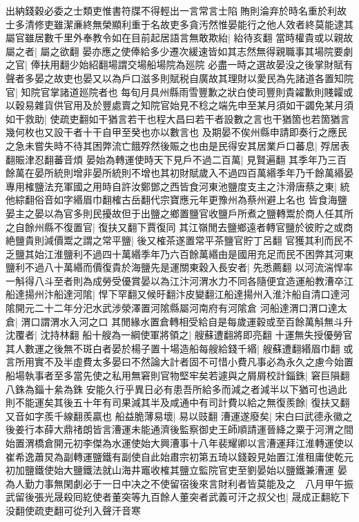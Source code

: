 出納錢穀必委之士類吏惟書符牒不得輕出一言常言士陷賄則淪弃於時名重於利故士多清修吏雖潔亷終無榮顯利重于名故吏多貪汚然惟晏能行之他人效者終莫能逮其屬官雖居數千里外奉教令如在目前起居語言無敢欺紿|{
	紿待亥翻}
當時權貴或以親故屬之者|{
	屬之欲翻}
晏亦應之使俸給多少遷次緩速皆如其志然無得親職事其場院要劇之官|{
	俸扶用翻少始紹翻場謂交場船場院為廵院}
必盡一時之選故晏没之後掌財賦有聲者多晏之故吏也晏又以為戶口滋多則賦税自廣故其理財以愛民為先諸道各置知院官|{
	知院官掌諸道廵院者也}
每旬月具州縣雨雪豐歉之狀白使司豐則貴糴歉則賤糶或以穀易雜貨供官用及於豐處賣之知院官始見不稔之端先申至某月須如干蠲免某月須如干救助|{
	使疏吏翻如干猶言若干也程大昌曰若干者設數之言也干猶箇也若箇猶言幾何枚也又設干者十干自甲至癸也亦以數言也}
及期晏不俟州縣申請即奏行之應民之急未嘗失時不待其困弊流亡餓殍然後賑之也由是民得安其居業戶口蕃息|{
	殍居表翻賑津忍翻蕃音煩}
晏始為轉運使時天下見戶不過二百萬|{
	見賢遍翻}
其季年乃三百餘萬在晏所統則增非晏所統則不增也其初財賦歲入不過四百萬緡季年乃千餘萬緡晏專用榷鹽法充軍國之用時自許汝鄭鄧之西皆食河東池鹽度支主之汴滑唐蔡之東|{
	統他綜翻俗音如字緡眉巾翻榷古岳翻代宗寶應元年更豫州為蔡州避上名也}
皆食海鹽晏主之晏以為官多則民擾故但于出鹽之鄉置鹽官收鹽戶所煮之鹽轉鬻於商人任其所之自餘州縣不復置官|{
	復扶又翻下賈復同}
其江嶺閒去鹽鄉遠者轉官鹽於彼貯之或商絶鹽貴則減價鬻之謂之常平鹽|{
	後又榷茶遂置常平茶鹽官貯丁呂翻}
官獲其利而民不乏鹽其始江淮鹽利不過四十萬緡季年乃六百餘萬緡由是國用充足而民不困弊其河東鹽利不過八十萬緡而價復貴於海鹽先是運關東穀入長安者|{
	先悉薦翻}
以河流湍悍率一斛得八斗至者則為成勞受優賞晏以為江汴河渭水力不同各隨便宜造運船教漕卒江船達揚州汴船達河隂|{
	悍下罕翻又候旴翻汴皮變翻江船達揚州入淮汴船自清口達河隂開元二十二年分汜水武涉滎澤置河隂縣屬河南府有河隂倉}
河船達渭口渭口達太倉|{
	渭口謂渭水入河之口}
其閒緣水置倉轉相受給自是每歲運穀或至百餘萬斛無斗升沈覆者|{
	沈持林翻}
船十艘為一綱使軍將領之|{
	艘蘇遭翻將即亮翻}
十運無失授優勞官其人數運之後無不斑白者晏於楊子置十場造船每艘給錢千緡|{
	艘蘇遭翻緡眉巾翻}
或言所用實不及半虛費太多晏曰不然論大計者固不可惜小費凡事必為永久之慮今始置船場執事者至多當先使之私用無窘則官物堅牢矣若遽與之屑屑校計錙銖|{
	窘巨隕翻八銖為錙十絫為銖}
安能久行乎異日必有患吾所給多而減之者減半以下猶可也過此則不能運矣其後五十年有司果減其半及咸通中有司計費以給之無復羨餘|{
	復扶又翻又音如字羨千線翻羨贏也}
船益脆薄易壞|{
	易以豉翻}
漕運遂廢矣|{
	宋白曰武德永徽之後姜行本薛大鼎禇朗皆言漕運未能通濟後監察御史王師順請運晉絳之粟于河渭之間始置渭橋倉開元初李傑為水運使始大興漕事十八年裴耀卿以言漕運拜江淮轉運使以崔希逸蕭炅為副轉運鹽鐵有副使自此始肅宗初第五琦以錢穀見始置江淮租庸使乾元初加鹽鐵使始大鹽鐵法就山海井竈收榷其鹽立監院官吏至劉晏始以鹽鐵兼漕運}
晏為人勤力事無閑劇必于一日中决之不使留宿後來言財利者皆莫能及之　八月甲午振武留後張光晟殺囘紇使者董突等九百餘人董突者武義可汗之叔父也|{
	晟成正翻紇下没翻使疏吏翻可從刋入聲汗音寒}
